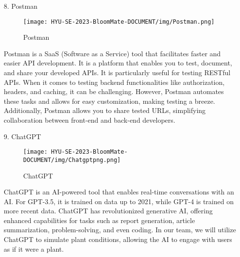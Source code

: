 \documentclass[conference, a4paper]{IEEEtran}
\begin{document}
\begin{enumerate}
    \item[8.]Postman
    \begin{figure}[h]
    \centering
    \texttt{[image: HYU-SE-2023-BloomMate-DOCUMENT/img/Postman.png]}
    \label{fig:Postman}
    \caption{Postman} 
    \end{figure}
    \item[]Postman is a SaaS (Software as a Service) tool that facilitates faster and easier API development. It is a platform that enables you to test, document, and share your developed APIs. It is particularly useful for testing RESTful APIs. When it comes to testing backend functionalities like authorization, headers, and caching, it can be challenging. However, Postman automates these tasks and allows for easy customization, making testing a breeze. Additionally, Postman allows you to share tested URLs, simplifying collaboration between front-end and back-end developers.\\



    \item[9.]ChatGPT
    \begin{figure}[h]
    \centering
    \texttt{[image: HYU-SE-2023-BloomMate-DOCUMENT/img/Chatgptpng.png]}
    \label{fig:ChatGPT}
    \caption{ChatGPT} 
    \end{figure} 
    \item[]ChatGPT is an AI-powered tool that enables real-time conversations with an AI. For GPT-3.5, it is trained on data up to 2021, while GPT-4 is trained on more recent data. ChatGPT has revolutionized generative AI, offering enhanced capabilities for tasks such as report generation, article summarization, problem-solving, and even coding. In our team, we will utilize ChatGPT to simulate plant conditions, allowing the AI to engage with users as if it were a plant.\\ 


\end{enumerate}
\end{document}
